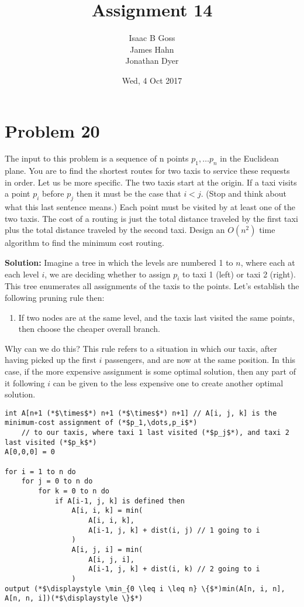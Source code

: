 \documentclass{article}
\author{Isaac B Goss\\ James Hahn\\ Jonathan Dyer}
\title{Assignment 14}
\date{Wed, 4 Oct 2017}
\providecommand{\prob}[1]{\section*{Problem #1}}
\providecommand{\soln}{\textbf{Solution: }}
\begin{document}
\maketitle
\prob{20}
The input to this problem is a sequence of n points $p_1, \dots p_n$ in the Euclidean plane. You are to find the shortest routes for two taxis to service these requests in order. Let us be more specific. The two taxis start at the origin. If a taxi visits a point $p_i$ before $p_j$ then it must be the case that $i < j$. (Stop and think about what this last sentence means.) Each point must be visited by at least one of the two taxis. The cost of a routing is just the total distance traveled by the first taxi plus the total distance traveled by the second taxi. Design an $O\left(n^2\right)$ time algorithm to find the minimum cost routing.

\soln Imagine a tree in which the levels are numbered 1 to $n$, where each at each level $i$, we are deciding whether to assign $p_i$ to taxi 1 (left) or taxi 2 (right).
This tree enumerates all assignments of the taxis to the points.
Let's establish the following pruning rule then:
\begin{enumerate}
    \item If two nodes are at the same level, and the taxis last visited the same points, then choose the cheaper overall branch.
\end{enumerate}

Why can we do this? This rule refers to a situation in which our taxis, after having picked up the first $i$ passengers, and are now at the same position.
In this case, if the more expensive assignment is some optimal solution, then any part of it following $i$ can be given to the less expensive one to create another optimal solution.

\begin{lstlisting}
int A[n+1 (*$\times$*) n+1 (*$\times$*) n+1] // A[i, j, k] is the minimum-cost assignment of (*$p_1,\dots,p_i$*)
    // to our taxis, where taxi 1 last visited (*$p_j$*), and taxi 2 last visited (*$p_k$*)
A[0,0,0] = 0

for i = 1 to n do 
    for j = 0 to n do
        for k = 0 to n do
            if A[i-1, j, k] is defined then
                A[i, i, k] = min( 
                    A[i, i, k], 
                    A[i-1, j, k] + dist(i, j) // 1 going to i
                )
                A[i, j, i] = min( 
                    A[i, j, i], 
                    A[i-1, j, k] + dist(i, k) // 2 going to i
                )
output (*$\displaystyle \min_{0 \leq i \leq n} \{$*)min(A[n, i, n], A[n, n, i])(*$\displaystyle \}$*)
\end{lstlisting}
\end{document}
